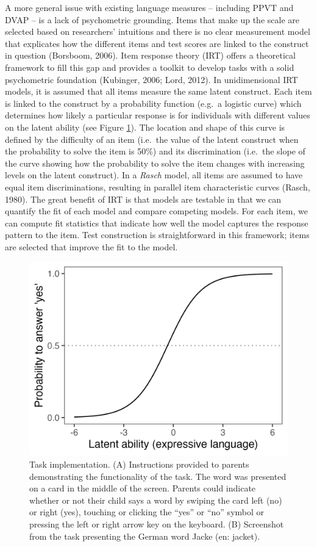 \documentclass[
  man,floatsintext]{apa6}
\begin{document}
A more general issue with existing language measures -- including PPVT and DVAP -- is a lack of psychometric grounding. Items that make up the scale are selected based on researchers' intuitions and there is no clear measurement model that explicates how the different items and test scores are linked to the construct in question (Borsboom, 2006). Item response theory (IRT) offers a theoretical framework to fill this gap and provides a toolkit to develop tasks with a solid psychometric foundation (Kubinger, 2006; Lord, 2012). In unidimensional IRT models, it is assumed that all items measure the same latent construct. Each item is linked to the construct by a probability function (e.g.~a logistic curve) which determines how likely a particular response is for individuals with different values on the latent ability (see Figure \ref{fig:figr}). The location and shape of this curve is defined by the difficulty of an item (i.e.~the value of the latent construct when the probability to solve the item is 50\%) and its discrimination (i.e.~the slope of the curve showing how the probability to solve the item changes with increasing levels on the latent construct). In a \emph{Rasch} model, all items are assumed to have equal item discriminations, resulting in parallel item characteristic curves (Rasch, 1980). The great benefit of IRT is that models are testable in that we can quantify the fit of each model and compare competing models. For each item, we can compute fit statistics that indicate how well the model captures the response pattern to the item. Test construction is straightforward in this framework; items are selected that improve the fit to the model.



\begin{figure}

{\centering \includegraphics[width=0.5\linewidth]{../graphs/figr} 

}

\caption{Task implementation. (A) Instructions provided to parents demonstrating the functionality of the task. The word was presented on a card in the middle of the screen. Parents could indicate whether or not their child says a word by swiping the card left (no) or right (yes), touching or clicking the ``yes'' or ``no'' symbol or pressing the left or right arrow key on the keyboard. (B) Screenshot from the task presenting the German word Jacke (en: jacket).}\label{fig:figr}
\end{figure}
\end{document}
